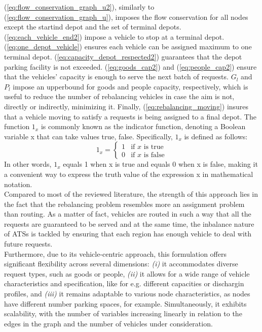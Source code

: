 (\ref{eq:flow_conservation_graph_u2}), similarly to (\ref{eq:flow_conservation_graph_u}), imposes the flow conservation for all nodes except the startind depot and the set of terminal depots. (\ref{eq:each_vehicle_end2}) impose a vehicle to stop at a terminal depot.  (\ref{eq:one_depot_vehicle}) ensures each vehicle can be assigned maximum to one terminal depot. (\ref{eq:capacity_depot_respected2}) guarantees that the depot parking facility is not exceeded. (\ref{eq:goods_cap2}) and (\ref{eq:people_cap2}) ensure that the vehicles' capacity is enough to serve the next batch of requests. $G_{l}$ and $P_l$ impose an upperbound for goods and people capacity, respectively, which is useful to reduce the number of rebalancing vehicles in case the aim is not, directly or indirectly, minimizing it. Finally, (\ref{eq:rebalancing_moving}) insures that a vehicle moving to satisfy a requests is being assigned to a final depot. The function $1_x$ is commonly known as the indicator function, denoting a Boolean variable x that can take values {true, false}. Specifically, $1_x$ is defined as follows:
\begin{equation}
	1_x = \begin{cases}
		1 & \text{if } x \text{ is true} \\
		0 & \text{if } x \text{ is false}
	\end{cases}
\end{equation}
In other words, $1_x$ equals 1 when x is true and equals 0 when x is false, making it a convenient way to express the truth value of the expression x in mathematical notation.\\
Compared to most of the reviewed literature, the strength of this approach lies in the fact that the rebalancing problem resembles more an assignment problem than routing. As a matter of fact, vehicles are routed in such a way that all the requests are guaranteed to be served and at the same time, the inbalance nature of ATSs is tackled by ensuring that each region has enough vehicle to deal with future requests. \\
Furthermore, due to its vehicle-centric approach, this formulation offers significant flexibility across several dimensions: \textit{(i)} it accommodates diverse request types, such as goods or people, \textit{(ii)} it allows for a wide range of vehicle characteristics and specification, like for e.g. different capacities or dischargin profiles, and \textit{(iii)} it remains adaptable to various node characteristics, as nodes have different number parking spaces, for example. Simultaneously, it exhibits scalability, with the number of variables increasing linearly in relation to the edges in the graph and the number of vehicles under consideration.\\
